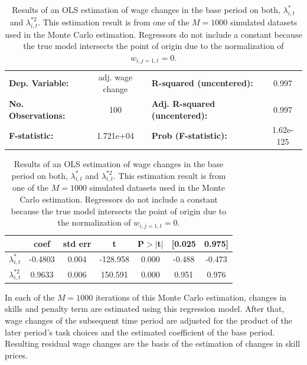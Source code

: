 \documentclass[../main.tex]{subfiles}
\begin{document}
\begin{table}
\begin{center}
\begin{tabular}{lclc}
\toprule
\textbf{Dep. Variable:}    & adj. wage change & \textbf{  R-squared (uncentered):}      &     0.997   \\
\textbf{No. Observations:} &       100        & \textbf{  Adj. R-squared (uncentered):} &     0.997   \\
\textbf{F-statistic:}      &  1.721e+04       & \textbf{  Prob (F-statistic):}          & 1.62e-125   \\
\bottomrule
\end{tabular}
\begin{tabular}{lcccccc}
                  & \textbf{coef} & \textbf{std err} & \textbf{t} & \textbf{P$> |$t$|$} & \textbf{[0.025} & \textbf{0.975]}  \\
\midrule
\textbf{$\lambda_{i, t}^{*}$}   &      -0.4803  &        0.004     &  -128.958  &         0.000        &       -0.488    &       -0.473     \\
\textbf{$\lambda_{i, t}^{*2}$} &       0.9633  &        0.006     &   150.591  &         0.000        &        0.951    &        0.976     \\
\bottomrule
\end{tabular}

\end{center}
\caption{Results of an OLS estimation of wage changes in the base period on both, $\lambda_{i, t}^{*}$ and $\lambda_{i, t}^{*2}$. This estimation result is from one of the $M = 1000$ simulated datasets used in the Monte Carlo estimation. Regressors do not include a constant because the true model intersects the point of origin due to the normalization of $w_{i,j=1,t} = 0$.}
\label{tab:base_period_regression_rlst}
\end{table}
In each of the $M=1000$ iterations of this Monte Carlo estimation, changes in skills and penalty term are estimated using this regression model. After that, wage changes of the subsequent time period are adjusted for the product of the later period's task choices and the estimated coefficient of the base period. Resulting residual wage changes are the basis of the estimation of changes in skill prices.
\\
\end{document}
